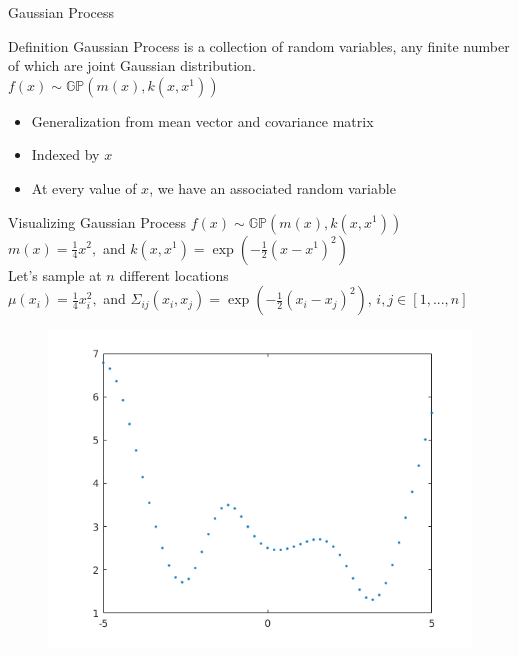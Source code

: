\begin{frame}{Gaussian Process}
    \begin{block}{Definition}
        Gaussian Process is a collection of random variables, any finite number
        of which are joint Gaussian distribution. \\
$f(x) \sim \mathbb{GP}(m(x),k(x,x^1))$
    \end{block}
    \begin{itemize}
        \item Generalization from mean vector and covariance matrix
        \item Indexed by $x$
        \item At every value of $x$, we have an associated random variable
        \end{itemize}


\end{frame}

\begin{frame}{Visualizing Gaussian Process}
$f(x) \sim \mathbb{GP}(m(x),k(x,x^1))$ \\
$m(x) = \frac{1}{4}x^2,$ and $k(x,x^1) = \exp{(-\frac{1}{2}(x-x^1)^2)}$\\
Let's sample at $n$ different locations\\
$\mu(x_i) = \frac{1}{4}x_i^2,$ and $\Sigma_{ij}(x_i,x_j) =
\exp{(-\frac{1}{2}(x_i-x_j)^2)}$, $i,j \in [1,...,n]$
\begin{figure}
\centering
\includegraphics[width=0.5\linewidth]{figures/converted_sampling_gp}
\end{figure}
\end{frame}

